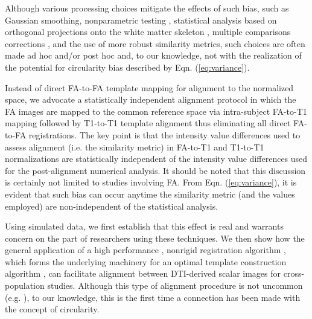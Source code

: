 \documentclass[final,5p,times,twocolumn]{elsarticle}
\begin{document}
Although various processing choices mitigate the effects of such bias,
such as Gaussian smoothing, nonparametric testing \citep{Rorden2007}, 
statistical analysis based on orthogonal projections onto the white matter skeleton 
\cite{Smith2006}, multiple comparisons corrections \cite{Nichols2003}, and the use of more robust similarity metrics, 
such choices are often made ad hoc and/or post hoc and, to our 
knowledge, not with the realization of the potential
for circularity bias described by Eqn. (\ref{eq:variance}).  

Instead of direct FA-to-FA template mapping for 
alignment to the normalized space, we advocate a statistically 
independent alignment protocol in which the FA images are mapped to 
the common reference space via intra-subject FA-to-T1 mapping 
followed by T1-to-T1 template alignment thus eliminating all direct
FA-to-FA registrations. The key point is that the intensity value differences used 
to assess alignment (i.e. the similarity metric) in FA-to-T1 and T1-to-T1 
normalizations are statistically independent of the intensity value differences used for 
the post-alignment numerical analysis.  It should be noted that this discussion
is certainly not limited to studies involving FA.  From 
Eqn. (\ref{eq:variance}), it is evident that such bias can occur anytime the 
similarity metric (and the values employed) are non-independent of 
the statistical analysis. 

Using simulated data, we first establish that this effect is real 
and warrants concern on the part of researchers using 
these techniques.  We then show how the general application
of a high performance \citep{Klein2009}, nonrigid registration algorithm 
\citep{Avants2011}, which forms the underlying machinery for an optimal 
template construction algorithm \citep{Avants2010}, can facilitate alignment 
between DTI-derived scalar images for cross-population studies.  
Although this type of alignment procedure is not uncommon 
(e.g. \cite{Lipton2008}), to our knowledge, this is the 
first time a connection has been made with the concept of 
circularity.  

\end{document}
